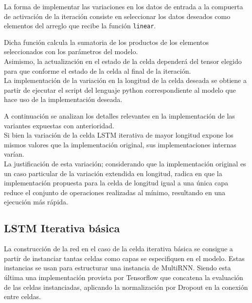 \documentclass{article}
\begin{document}


La forma de implementar las variaciones en los datos de entrada a la compuerta de activación de la iteración consiste en seleccionar los datos deseados como elementos  del arreglo que recibe la función \texttt{linear}.

Dicha función calcula la sumatoria de los productos de los elementos seleccionados con los parámetros del modelo.\\

Asimismo, la actualización en el estado de la celda dependerá del tensor elegido para que conforme el estado de la celda al final de la iteración.\\

La implementación de la variación en la longitud de la celda deseada se obtiene a partir de ejecutar el script del lenguaje python correspondiente al modelo que hace uso de la implementación deseada.

A continuación se analizan los detalles relevantes en la implementación de las variantes expuestas con anterioridad.\\

Si bien la variación de la celda LSTM iterativa de mayor longitud expone los mismos valores que la implementación original, sus implementaciones internas varían. \\

La justificación de esta variación; considerando que la implementación original es un caso particular de la variación extendida en longitud, radica en que la implementación propuesta para la celda de longitud igual a una única capa reduce el conjunto de operaciones realizadas al mínimo, resultando en una ejecución más rápida.\\

\subsection{LSTM Iterativa básica}

La construcción de la red en el caso de la celda iterativa básica se consigue a partir de instanciar tantas celdas como capas se especifiquen en el modelo. Estas instancias se usan para estructurar una instancia de MultiRNN. Siendo esta última una implementación provista por Tensorflow que concatena la evaluación de las celdas instanciadas, aplicando la normalización por Dropout en la conexión entre celdas.\\
\end{document}
